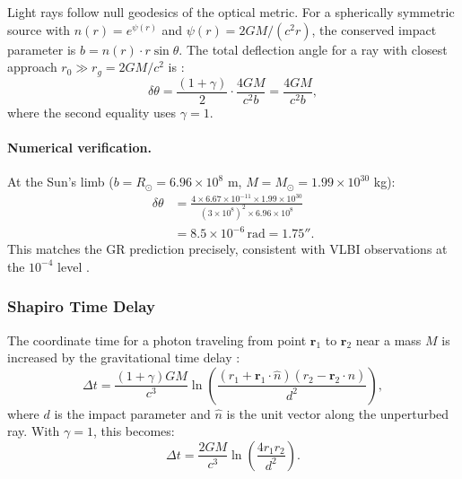 Light rays follow null geodesics of the optical metric. For a spherically symmetric source with $n(r) = e^{\psi(r)}$ and $\psi(r) = 2GM/(c^2 r)$, the conserved impact parameter is $b = n(r) \cdot r \sin\theta$. The total deflection angle for a ray with closest approach $r_0 \gg r_g = 2GM/c^2$ is \cite{Will2014}:
\begin{equation}\label{eq:deflection}
\delta\theta = \frac{(1 + \gamma)}{2} \cdot \frac{4GM}{c^2 b} = \frac{4GM}{c^2 b},
\end{equation}
where the second equality uses $\gamma = 1$.

\paragraph{Numerical verification.}
At the Sun's limb ($b = R_{\odot} = 6.96 \times 10^8$ m, $M = M_{\odot} = 1.99 \times 10^{30}$ kg):
\begin{equation}
\begin{split}
\delta\theta &= \frac{4 \times 6.67 \times 10^{-11} \times 1.99 \times 10^{30}}{(3 \times 10^8)^2 \times 6.96 \times 10^8} \\
&= 8.5 \times 10^{-6}\,\text{rad} = 1.75''.
\end{split}
\end{equation}
This matches the GR prediction precisely, consistent with VLBI observations at the $10^{-4}$ level \cite{Shapiro2004}.

\subsubsection{Shapiro Time Delay}\label{sec:ppn-shapiro}

The coordinate time for a photon traveling from point $\mathbf{r}_1$ to $\mathbf{r}_2$ near a mass $M$ is increased by the gravitational time delay \cite{Shapiro1964}:
\begin{equation}\label{eq:shapiro}
\Delta t = \frac{(1 + \gamma)GM}{c^3} \ln\left(\frac{(r_1 + \mathbf{r}_1 \cdot \hat{n})(r_2 - \mathbf{r}_2 \cdot \hat{n})}{d^2}\right),
\end{equation}
where $d$ is the impact parameter and $\hat{n}$ is the unit vector along the unperturbed ray. With $\gamma = 1$, this becomes:
\begin{equation}
\Delta t = \frac{2GM}{c^3} \ln\left(\frac{4r_1 r_2}{d^2}\right).
\end{equation}

